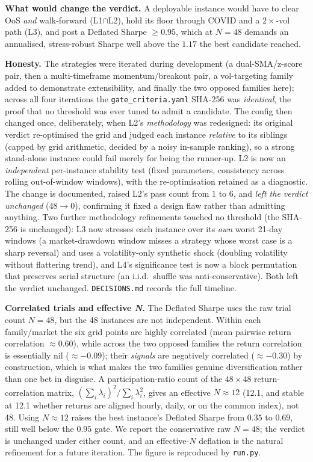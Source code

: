 \documentclass[11pt]{article}
\newcommand{\code}[1]{\texttt{\small #1}}
\begin{document}
\textbf{What would change the verdict.} A deployable instance would have to clear OoS
\emph{and} walk-forward (L1$\cap$L2), hold its floor through COVID and a $2\times$-vol
path (L3), and post a Deflated Sharpe $\ge0.95$, which at $N=48$ demands an
annualised, stress-robust Sharpe well above the $1.17$ the best candidate reached.

\textbf{Honesty.} The strategies were iterated during development (a dual-SMA/z-score
pair, then a multi-timeframe momentum/breakout pair, a vol-targeting family added to
demonstrate extensibility, and finally the two opposed families here); across all
four iterations the \code{gate\_criteria.yaml} SHA-256 was \emph{identical}, the
proof that no threshold was ever tuned to admit a candidate. The config then changed
once, deliberately, when L2's \emph{methodology} was redesigned: its original verdict
re-optimised the grid and judged each instance \emph{relative} to its siblings
(capped by grid arithmetic, decided by a noisy in-sample ranking), so a strong
stand-alone instance could fail merely for being the runner-up. L2 is now an
\emph{independent} per-instance stability test (fixed parameters, consistency across
rolling out-of-window windows), with the re-optimisation retained as a diagnostic.
The change is documented, raised L2's pass count from $1$ to $6$, and \emph{left the
verdict unchanged} ($48\rightarrow0$), confirming it fixed a design flaw rather
than admitting anything. Two further methodology refinements touched no threshold (the SHA-256 is unchanged):
L3 now stresses each instance over its \emph{own} worst 21-day windows (a market-drawdown
window misses a strategy whose worst case is a sharp reversal) and uses a volatility-only
synthetic shock (doubling volatility without flattering trend), and L4's significance test
is now a block permutation that preserves serial structure (an i.i.d.\ shuffle was
anti-conservative). Both left the verdict unchanged.
\code{DECISIONS.md} records the full timeline.

\textbf{Correlated trials and effective \emph{N}.} The Deflated Sharpe uses the raw
trial count $N=48$, but the 48 instances are not independent. Within each
family/market the six grid points are highly correlated (mean pairwise return
correlation $\approx0.60$), while across the two opposed families the return
correlation is essentially nil ($\approx-0.09$); their \emph{signals} are
negatively correlated ($\approx-0.30$) by construction, which is what makes the
two families genuine diversification rather than one bet in disguise. A
participation-ratio count of the $48\times48$ return-correlation matrix,
$(\sum_i\lambda_i)^2/\sum_i\lambda_i^2$, gives an effective $N\approx12$ (12.1,
and stable at 12.1 whether returns are aligned hourly, daily, or on the common
index), not 48. Using $N\approx12$ raises the best instance's Deflated Sharpe from
$0.35$ to $0.69$, still well below the $0.95$ gate. We report the conservative raw
$N=48$; the verdict is unchanged under either count, and an effective-$N$ deflation
is the natural refinement for a future iteration. The figure is reproduced by
\code{run.py}.
\end{document}
